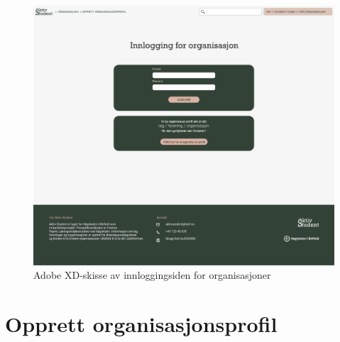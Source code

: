 \begin{figure}[H]
\centering
\includegraphics[width=\textwidth]{Illustrasjoner/Skisser-pdf/3.0/3-15-innlogging-organisasjon.pdf}
\caption{Adobe XD-skisse av innloggingsiden for organisasjoner}
\label{vedlegg:3-15-innlogging-org}
\end{figure}

\section{Opprett organisasjonsprofil}

